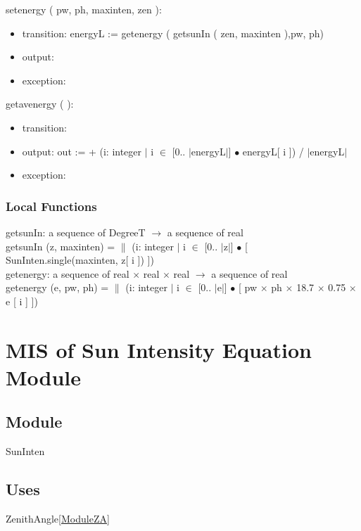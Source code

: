 \documentclass[12pt, titlepage]{article}
\begin{document}
\noindent  setenergy ( pw, ph, maxinten, zen ):
\begin{itemize}
\item transition:
energyL := getenergy ( getsunIn ( zen, maxinten ),pw, ph)
\item output:
 
\item exception: 
\end{itemize}

\noindent  getavenergy ( ):
\begin{itemize}
\item transition: 
\item output: out := + (i: integer $|$ i $\in$ [0.. $|$energyL$|$] $\bullet$  energyL[ i ]) / $|$energyL$|$
\item exception: 
\end{itemize}


\subsubsection{Local Functions}
getsunIn: a sequence of DegreeT $\rightarrow$ a sequence of real\\
getsunIn (z, maxinten) = $\|$ (i: integer $|$ i $\in$ [0.. $|$z$|$] $\bullet$ [ SunInten.single(maxinten, z[ i ]) ])\\

getenergy: a sequence of real $\times$ real $\times$ real $\rightarrow$ a sequence of real\\
getenergy (e, pw, ph) =  $\|$ (i: integer $|$ i $\in$ [0.. $|$e$|$] $\bullet$ [ pw $\times$ ph $\times$ 18.7 $\times$ 0.75 $\times$ e [ i ] ])


\section{MIS of Sun Intensity Equation Module} \label{ModuleSI} 



\subsection{Module}
SunInten

\subsection{Uses}
ZenithAngle\ref{ModuleZA}
\end{document}
